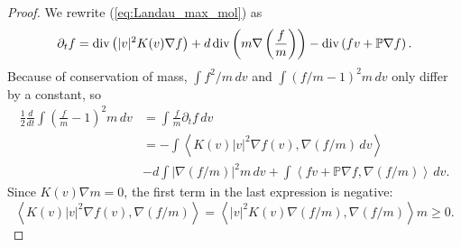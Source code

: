 \documentclass[11pt]{amsart}
\numberwithin{equation}{section}
\begin{document}
\begin{proof}
 We rewrite (\ref{eq:Landau_max_mol}) as 
 \begin{align*}
  \partial_{t}f  =\textnormal{div}\left(\vert v\vert^{2}K(v)\nabla f\right)+d\,\textnormal{div}\left( m \nabla \left(\frac{f}{ m } \right)\right)-\textnormal{div}\left(fv+\mathbb{P}\nabla f\right).
\end{align*}
Because of conservation of mass,  $\int f^2/m\,dv$ and $\int \left(f/m-1\right)^2m\,dv$ only differ by a constant, so
  \begin{align*}
    \frac{1}{2}\frac{d}{dt}\int\left(\frac{f}{ m }-1\right)^{2} m\,dv & 
    = \int \frac{f}{m}\partial_tf\,dv \\
    & = -\int\left\langle K(v)\left\vert v \right\vert ^{2}\nabla f(v),\nabla\left(f/ m \right)\,dv \right\rangle \\ 
    & -d\int\left\vert \nabla\left(f/ m \right) \right\vert ^{2} m\,dv 
    +\int\left\langle fv+\mathbb{P}\nabla f,\nabla(f/ m ) \right\rangle\,dv .
  \end{align*}
  Since $K(v) \nabla m =0$, the first term in the last expression is negative:
  \begin{equation*}
    \left\langle K(v)\left\vert v \right\vert ^{2}\nabla f(v),\nabla\left(f/ m \right) \right\rangle =\left\langle \left\vert v \right\vert ^{2}K(v)\nabla(f/ m ),\nabla\left(f/ m \right) \right\rangle  m \geq0.
  \end{equation*}
  

\end{proof}
\end{document}
